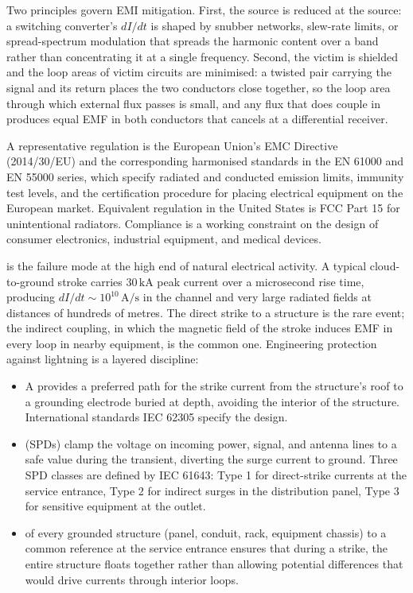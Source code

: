 Two principles govern EMI mitigation. First, the source is reduced at
the source: a switching converter's $dI/dt$ is shaped by snubber
networks, slew-rate limits, or spread-spectrum modulation that
spreads the harmonic content over a band rather than concentrating it
at a single frequency. Second, the victim is shielded and the loop
areas of victim circuits are minimised: a twisted pair carrying the
signal and its return places the two conductors close together, so
the loop area through which external flux passes is small, and any
flux that does couple in produces equal EMF in both conductors that
cancels at a differential receiver.

A representative regulation is the European Union's EMC Directive
(2014/30/EU) and the corresponding harmonised standards in the
EN 61000 and EN 55000 series, which specify radiated and conducted
emission limits, immunity test levels, and the certification
procedure for placing electrical equipment on the European market.
Equivalent regulation in the United States is FCC Part 15 for
unintentional radiators. Compliance is a working constraint on the
design of consumer electronics, industrial equipment, and medical
devices.

 is the failure mode at the high end of natural
electrical activity. A typical cloud-to-ground stroke carries
$30\,\si{\kilo\ampere}$ peak current over a microsecond rise time,
producing $dI/dt \sim 10^{10}\,\si{\ampere\per\second}$ in the
channel and very large radiated fields at distances of hundreds of
metres. The direct strike to a structure is the rare event; the
indirect coupling, in which the magnetic field of the stroke induces
EMF in every loop in nearby equipment, is the common one.
Engineering protection against lightning is a layered discipline:
\begin{itemize}[leftmargin=*]
  \item A  provides a preferred
    path for the strike current from the structure's roof to a
    grounding electrode buried at depth, avoiding the interior of the
    structure. International standards IEC 62305 specify the design.
  \item {} (SPDs) clamp the voltage on
    incoming power, signal, and antenna lines to a safe value during
    the transient, diverting the surge current to ground. Three SPD
    classes are defined by IEC 61643: Type 1 for direct-strike currents
    at the service entrance, Type 2 for indirect surges in the
    distribution panel, Type 3 for sensitive equipment at the outlet.
  \item {} of every grounded structure (panel, conduit,
    rack, equipment chassis) to a common reference at the service
    entrance ensures that during a strike, the entire structure
    floats together rather than allowing potential differences that
    would drive currents through interior loops.
\end{itemize}

